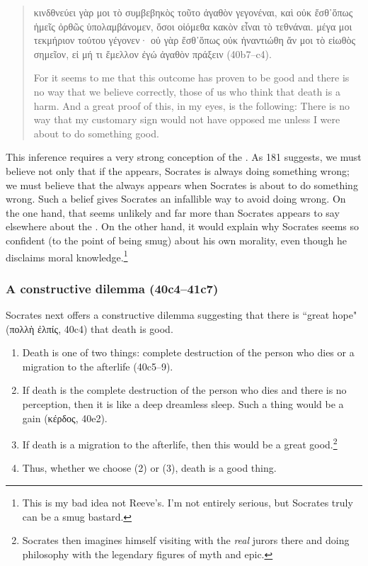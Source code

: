 \documentclass[11pt]{article}
\begin{document}
\begin{quote}
    {\g κινδθνεύει γὰρ μοι τὸ συμβεβηκὸς τοῦτο ἀγαθὸν γεγονέναι, καὶ οὐκ ἔσθ᾽ὅπως ἡμεῖς ὀρθῶς ὑπολαμβάνομεν, ὅσοι οἰόμεθα κακὸν εἶναι τὸ τεθνάναι. μέγα μοι τεκμήριον τούτου γέγονεν· οὐ γὰρ ἔσθ᾽ὅπως οὐκ ἠναντιώθη ἄν μοι τὸ εἰωθὸς σημεῖον, εἰ μή τι ἔμελλον ἐγώ ἀγαθὸν πράξειν} (40b7--c4).

    For it seems to me that this outcome has proven to be good and there is no way that we believe correctly, those of us who think that death is a harm. And a great proof of this, in my eyes, is the following: There is no way that my customary sign would not have opposed me unless I were about to do something good.
\end{quote}

This inference requires a very strong conception of the .
As \citet{reeve1989} 181 suggests, we must believe not only that if the
 appears, Socrates is always doing something wrong; we must
believe that the  always appears when Socrates is about to
do something wrong.  Such a belief gives Socrates an infallible way to avoid
doing wrong.  On the one hand, that seems unlikely and far more than Socrates appears to say elsewhere about the .  On the other hand, it would explain why Socrates seems so confident (to the point of being smug) about his own morality, even though he disclaims moral knowledge.\footnote{This is my bad idea not Reeve's.  I'm not entirely serious, but Socrates truly can be a smug bastard.}


\subsubsection{A constructive dilemma (40c4--41c7)}

Socrates next offers a constructive dilemma suggesting that there is ``great hope" ({\g πολλὴ ἐλπίς}, 40c4) that death is good.

\begin{enumerate}
    \item Death is one of two things: complete destruction of the person who dies or a migration to the afterlife (40c5--9).
    \item If death is the complete destruction of the person who dies and there is no perception, then it is like a deep dreamless sleep.  Such a thing would be a gain ({\g κέρδος}, 40e2).
    \item If death is a migration to the afterlife, then this would be a great good.\footnote{Socrates then imagines himself visiting with the \emph{real} jurors there and doing philosophy with the legendary figures of myth and epic.}
    \item Thus, whether we choose (2) or (3), death is a good thing.
\end{enumerate}
\end{document}
